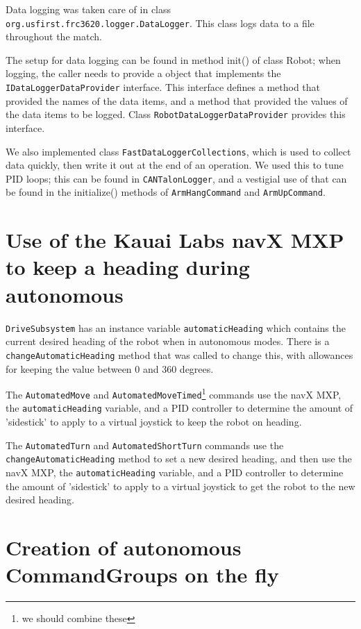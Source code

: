 \documentclass[]{article}
\begin{document}
Data logging was taken care of in class \texttt{org.usfirst.frc3620.logger.DataLogger}. This class logs data to a file throughout the match.

The setup for data logging can be found in method init() of class Robot; when logging, the caller needs to provide a object that implements the \texttt{IDataLoggerDataProvider} interface.
This interface defines a method that provided the names of the data items, and a method that provided the values of the data items to be logged.
Class \texttt{RobotDataLoggerDataProvider} provides this interface.

We also implemented class \texttt{FastDataLoggerCollections}, which is used to collect data quickly, then write it out at the end of an operation.
We used this to tune PID loops; this can be found in \texttt{CANTalonLogger}, and a vestigial use of that can be found in the initialize() methods of \texttt{ArmHangCommand} and \texttt{ArmUpCommand}. 

\section {Use of the Kauai Labs navX MXP to keep a heading during autonomous}

\texttt{DriveSubsystem} has an instance variable \texttt{automaticHeading} which contains the current desired heading of the robot when in autonomous modes. 
There is a \texttt{changeAutomaticHeading} method that was called to change this, with allowances for keeping the value between 0 and 360 degrees.

The \texttt{AutomatedMove} and \texttt{AutomatedMoveTimed}\footnote{we should combine these} commands use the navX MXP, the \texttt{automaticHeading} variable, and a PID controller to determine the amount of 'sidestick' to apply to a virtual joystick to keep the robot on heading.

The \texttt{AutomatedTurn} and \texttt{AutomatedShortTurn} commands use the \texttt{changeAutomaticHeading} method to set a new desired heading, and then use the navX MXP, the \texttt{automaticHeading} variable, and a PID controller to determine the amount of 'sidestick' to apply to a virtual joystick to get the robot to the new desired heading.

\section {Creation of autonomous CommandGroups on the fly}
\end{document}
